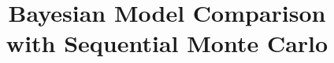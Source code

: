 \def\inthesis{}

\title{Bayesian Model Comparison \\with Sequential Monte Carlo}



\frontmatter
\maketitle
\tableofcontents

\mainmatter









\backmatter
\printbibliography


